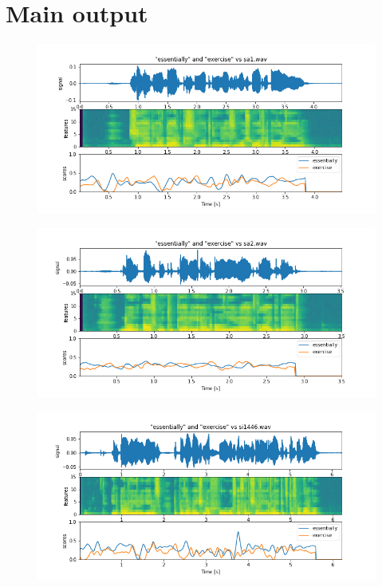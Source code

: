\documentclass[11pt]{article}
\begin{document}
\section{Main output}
\begin{figure}[H]
	\includegraphics[width=\linewidth]{./docs/sa1.png}
\end{figure}
\begin{figure}[H]
	\includegraphics[width=\linewidth]{./docs/sa2.png}
\end{figure}
\begin{figure}[H]
	\includegraphics[width=\linewidth]{./docs/si1446.png}
\end{figure}
\end{document}
